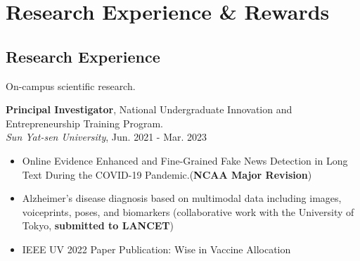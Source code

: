 \documentclass[8pt]{beamer}
\begin{document}
\section{Research Experience \& Rewards
}
\subsection{Research Experience}
\begin{frame}{On-campus scientific research.}

\textbf{Principal Investigator}, National Undergraduate Innovation and Entrepreneurship Training Program.\\
\textit{Sun Yat-sen University}, Jun. 2021 - Mar. 2023
\begin{itemize}
\item Online Evidence Enhanced and Fine-Grained Fake News Detection in Long Text During the COVID-19 Pandemic.(\textbf{NCAA Major Revision})
\item Alzheimer's disease diagnosis based on multimodal data including images, voiceprints, poses, and biomarkers (collaborative work with the University of Tokyo,\textbf{ submitted to LANCET})
\item {IEEE UV 2022 Paper Publication: Wise in Vaccine Allocation}
\end{itemize}
\end{frame}
\end{document}
